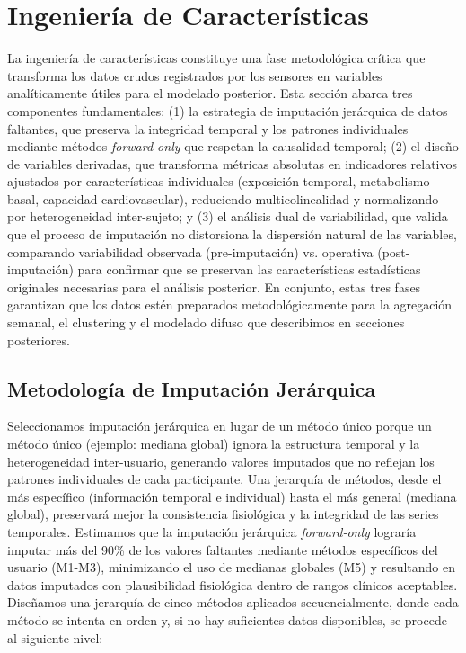\section{Ingeniería de Características}
\label{sec:feature_engineering}

La ingeniería de características constituye una fase metodológica crítica que transforma los datos crudos registrados por los sensores en variables analíticamente útiles para el modelado posterior. Esta sección abarca tres componentes fundamentales: (1) la estrategia de imputación jerárquica de datos faltantes, que preserva la integridad temporal y los patrones individuales mediante métodos \textit{forward-only} que respetan la causalidad temporal; (2) el diseño de variables derivadas, que transforma métricas absolutas en indicadores relativos ajustados por características individuales (exposición temporal, metabolismo basal, capacidad cardiovascular), reduciendo multicolinealidad y normalizando por heterogeneidad inter-sujeto; y (3) el análisis dual de variabilidad, que valida que el proceso de imputación no distorsiona la dispersión natural de las variables, comparando variabilidad observada (pre-imputación) vs. operativa (post-imputación) para confirmar que se preservan las características estadísticas originales necesarias para el análisis posterior. En conjunto, estas tres fases garantizan que los datos estén preparados metodológicamente para la agregación semanal, el clustering y el modelado difuso que describimos en secciones posteriores.

\subsection{Metodología de Imputación Jerárquica}
\label{subsec:metodologia_imputacion}

Seleccionamos imputación jerárquica en lugar de un método único porque un método único (ejemplo: mediana global) ignora la estructura temporal y la heterogeneidad inter-usuario, generando valores imputados que no reflejan los patrones individuales de cada participante. Una jerarquía de métodos, desde el más específico (información temporal e individual) hasta el más general (mediana global), preservará mejor la consistencia fisiológica y la integridad de las series temporales. Estimamos que la imputación jerárquica \textit{forward-only} lograría imputar más del 90\% de los valores faltantes mediante métodos específicos del usuario (M1-M3), minimizando el uso de medianas globales (M5) y resultando en datos imputados con plausibilidad fisiológica dentro de rangos clínicos aceptables. Diseñamos una jerarquía de cinco métodos aplicados secuencialmente, donde cada método se intenta en orden y, si no hay suficientes datos disponibles, se procede al siguiente nivel:

